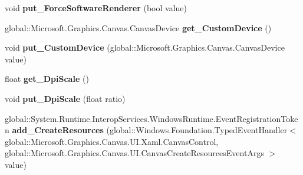 \begin{DoxyCompactItemize}
\item 
\mbox{\label{interface_microsoft_1_1_graphics_1_1_canvas_1_1_u_i_1_1_xaml_1_1_i_canvas_control_adb46fbfbe0e98392df3ff1ebdbfe650d}} 
void {\bfseries put\+\_\+\+Force\+Software\+Renderer} (bool value)
\item 
\mbox{\label{interface_microsoft_1_1_graphics_1_1_canvas_1_1_u_i_1_1_xaml_1_1_i_canvas_control_a662ab7bd653827c7b276b057e9eab211}} 
global\+::\+Microsoft.\+Graphics.\+Canvas.\+Canvas\+Device {\bfseries get\+\_\+\+Custom\+Device} ()
\item 
\mbox{\label{interface_microsoft_1_1_graphics_1_1_canvas_1_1_u_i_1_1_xaml_1_1_i_canvas_control_a4da1f97d13f825f768730d9598d88902}} 
void {\bfseries put\+\_\+\+Custom\+Device} (global\+::\+Microsoft.\+Graphics.\+Canvas.\+Canvas\+Device value)
\item 
\mbox{\label{interface_microsoft_1_1_graphics_1_1_canvas_1_1_u_i_1_1_xaml_1_1_i_canvas_control_aa82b042e077fa0bf256753af653fd201}} 
float {\bfseries get\+\_\+\+Dpi\+Scale} ()
\item 
\mbox{\label{interface_microsoft_1_1_graphics_1_1_canvas_1_1_u_i_1_1_xaml_1_1_i_canvas_control_a6e1d54ce91aed2c4bb4394e089748342}} 
void {\bfseries put\+\_\+\+Dpi\+Scale} (float ratio)
\item 
\mbox{\label{interface_microsoft_1_1_graphics_1_1_canvas_1_1_u_i_1_1_xaml_1_1_i_canvas_control_a8a6d5efad4792d05ccdb1542d9522d15}} 
global\+::\+System.\+Runtime.\+Interop\+Services.\+Windows\+Runtime.\+Event\+Registration\+Token {\bfseries add\+\_\+\+Create\+Resources} (global\+::\+Windows.\+Foundation.\+Typed\+Event\+Handler$<$ global\+::\+Microsoft.\+Graphics.\+Canvas.\+U\+I.\+Xaml.\+Canvas\+Control, global\+::\+Microsoft.\+Graphics.\+Canvas.\+U\+I.\+Canvas\+Create\+Resources\+Event\+Args $>$ value)
\item 

\end{DoxyCompactItemize}
